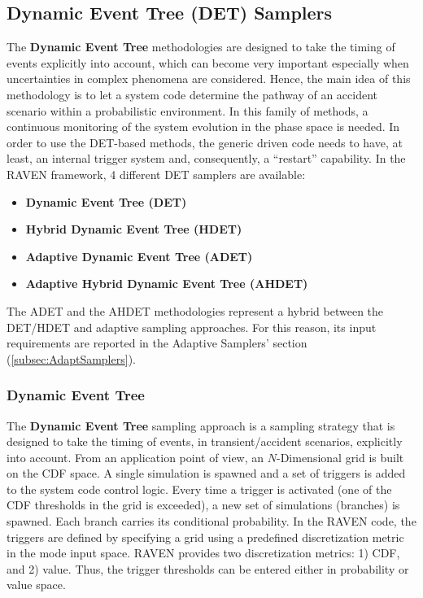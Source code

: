 \subsection{Dynamic Event Tree (DET) Samplers}
\label{subsec:DETSamplers}
The \textbf{Dynamic Event Tree} methodologies are designed to take the timing of
events explicitly into account, which can become very important especially when
uncertainties in complex phenomena are considered.
%
Hence, the main idea of this methodology is to let a system code determine the
pathway of an accident scenario within a probabilistic environment.
%
In this family of methods, a continuous monitoring of the system evolution in
the phase space is needed.
%
In order to use the DET-based methods, the generic driven code needs to have, at
least, an internal trigger system and, consequently, a ``restart'' capability.
%
In the RAVEN framework, 4 different DET samplers are available:
\begin{itemize}
\item \textbf{Dynamic Event Tree (DET)}
\item \textbf{Hybrid Dynamic Event Tree (HDET)}
\item \textbf{Adaptive Dynamic Event Tree (ADET)}
\item \textbf{Adaptive Hybrid Dynamic Event Tree (AHDET)}
\end{itemize}

The ADET and the AHDET methodologies represent a hybrid between the DET/HDET and adaptive sampling
approaches.
%
For this reason, its input requirements are reported in the Adaptive Samplers'
section (\ref{subsec:AdaptSamplers}).

\subsubsection{Dynamic Event Tree}
\label{subsubsubsec:DET}
The \textbf{Dynamic Event Tree} sampling approach is a sampling strategy that is
designed to take the timing of events, in transient/accident scenarios,
explicitly into account.
%
From an application point of view, an $N$-Dimensional grid is built on the CDF
space.
%
A single simulation is spawned and a set of triggers is added to the system code
control logic.
%
Every time a trigger is activated (one of the CDF thresholds in the grid is
exceeded), a new set of simulations (branches) is spawned.
%
Each branch carries its conditional probability.
%
In the RAVEN code, the triggers are defined by specifying a grid using a
predefined discretization metric in the mode input space.
%
RAVEN provides two discretization metrics: 1) CDF, and 2) value.
%
Thus, the trigger thresholds can be entered either in probability or value
space.
%

